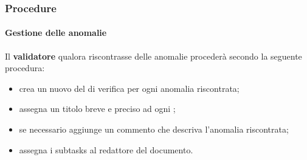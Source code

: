 \subsubsection{Procedure}
\label{sec:3.2.2}
	\paragraph{Gestione delle anomalie}
	\label{sec:3.2.2.1}
			Il \textbf{validatore} qualora riscontrasse delle anomalie procederà secondo la seguente procedura:
			\begin{itemize}
				\item crea un nuovo  del  di verifica per ogni anomalia riscontrata;
				\item assegna un titolo breve e preciso ad ogni ;
				\item se necessario aggiunge un commento che descriva l'anomalia riscontrata;
				\item assegna i subtasks al redattore del documento.
			\end{itemize}